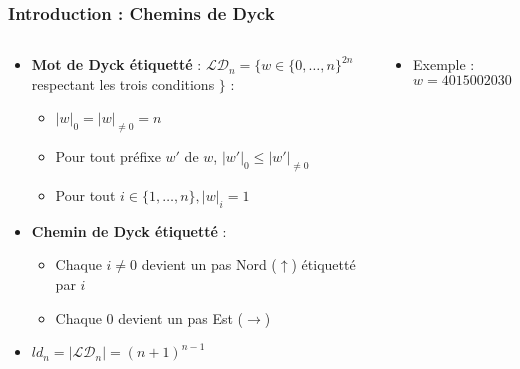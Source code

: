 \documentclass{beamer}
\begin{document}
\begin{frame}
    \frametitle{Introduction : Chemins de Dyck}
    \begin{columns}
        \begin{column}{0.6\textwidth}
            \begin{itemize}
                \item \textbf{Mot de Dyck étiquetté} : $\mathcal{LD}_n = 
                    \{w \in \{0,\ldots, n\}^{2n}$ respectant les 
                    trois conditions $\}$ :
                \begin{itemize}
                    \item $|w|_0 = |w|_{\neq 0} = n$
                    \item Pour tout préfixe $w'$ de $w$, $|w'|_0 \leqslant
                        |w'|_{\neq 0}$
                    \item Pour tout $i \in \{1, \ldots, n\}, |w|_i = 1$
                \end{itemize}
                \item \textbf{Chemin de Dyck étiquetté} :
                \begin{itemize}
                    \item Chaque $i \neq 0$ devient un pas Nord ($\uparrow$)
                        étiquetté par $i$
                    \item Chaque 0 devient un pas Est ($\rightarrow$)
                \end{itemize}
                \item $\displaystyle ld_n = |\mathcal{LD}_n| = (n+1)^{n-1}$
            \end{itemize}
        \end{column}
        \begin{column}{0.4\textwidth} 
                \begin{itemize}
                    \item Exemple : $w = 4015002030$
                \end{itemize}
                
        \end{column}
    \end{columns}
\end{frame}
\end{document}
